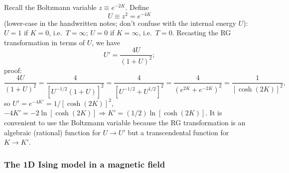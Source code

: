 \begin{diagram}
\end{diagram}

Recall the Boltzmann variable $z\equiv e^{-2K}$. Define
\begin{equation}
  U\equiv z^2 = e^{-4K}
\end{equation}
(lower-case in the handwritten notes; don't confuse with the internal energy $U$): $U = 1$ if $K = 0$, i.e.\
$T = \infty$; $U = 0$ if $K = \infty$, i.e.\ $T = 0$. Recasting the RG transformation in terms of $U$, we
have
\begin{equation}
  U' = \frac{4U}{(1+U)^2};
\end{equation}
proof:
\begin{equation}
  \frac{4U}{(1+U)^2} = \frac{4}{[U^{-1/2}(1+U)]^2} = \frac{4}{[U^{-1/2}+U^{1/2}]^2}
  = \frac{4}{(e^{2K}+e^{-2K})^2} = \frac{1}{[\cosh(2K)]^2},
\end{equation}
so $U' = e^{-4K'} = 1/[\cosh(2K)]^2$, $-4K' = -2\ln[\cosh(2K)]\Rightarrow K' = (1/2)\ln[\cosh(2K)]$.
It is convenient to use the Boltzmann variable because the RG transformation is an algebraic (rational)
function for $U\to U'$ but a transcendental function for $K\to K'$.

\subsubsection*{The 1D Ising model in a magnetic field}

